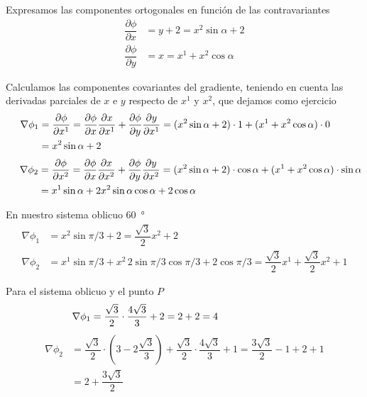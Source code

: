 Expresamos las componentes ortogonales en función de las contravariantes
\begin{align*}
  \dfrac{\partial\phi}{\partial x}
  &=
    y + 2
    = x^2\sin\alpha + 2\\
  \dfrac{\partial\phi}{\partial y}
  &=
    x
    = x^1 + x^2\cos\alpha
\end{align*}

Calculamos las componentes covariantes del gradiente, teniendo en cuenta las derivadas
parciales de $x$ e $y$ respecto de $x^1$ y $x^2$, que dejamos como ejercicio
\begin{align*}
  \hspace{-14em}
  \nabla\phi_1
  &=
    \dfrac{\partial\phi}{\partial x^1}
    = \dfrac{\partial\phi}{\partial x}\dfrac{\partial x}{\partial x^1}
    + \dfrac{\partial\phi}{\partial y}\dfrac{\partial y}{\partial x^1}
    = (x^2\sin\alpha+2)\cdot 1 + (x^1 + x^2\cos\alpha)\cdot 0\\
  &=
    x^2\sin\alpha + 2
\end{align*}
\begin{align*}
  \hspace{1.3em}
  \nabla\phi_2
  &=
    \dfrac{\partial\phi}{\partial x^2}
    = \dfrac{\partial\phi}{\partial x}\dfrac{\partial x}{\partial x^2}
    + \dfrac{\partial\phi}{\partial y}\dfrac{\partial y}{\partial x^2}
    = (x^2\sin\alpha+2)\cdot\cos\alpha + (x^1 + x^2\cos\alpha)\cdot\sin\alpha\\
  &=
    x^1\sin\alpha + 2x^2\sin\alpha\cos\alpha + 2\cos\alpha
\end{align*}

En nuestro sistema oblicuo \qty{60}{\degree}
\begin{align*}
  \nabla\phi_1
  &=
    x^2\sin\pi/3 + 2
    = \dfrac{\sqrt{3}}{2} x^2 + 2\\
  \nabla\phi_2
  &=
    x^1\sin\pi/3 + x^2\,2\sin\pi/3\cos\pi/3 + 2\cos\pi/3
    = \dfrac{\sqrt{3}}{2}x^1 + \dfrac{\sqrt{3}}{2} x^2 + 1
\end{align*}

Para el sistema oblicuo y el punto $P$
\begin{align*}
  \hspace{-7em}
  \nabla\phi_1
  &=
    \dfrac{\sqrt{3}}{2}\cdot \dfrac{4\sqrt{3}}{3} + 2
    = 2 + 2
    = 4
\end{align*}
\begin{align*}
  \nabla\phi_2
  &=
    \dfrac{\sqrt{3}}{2}\cdot \left(3-2\dfrac{\sqrt{3}}{3}\right)
    + \dfrac{\sqrt{3}}{2}\cdot\dfrac{4\sqrt{3}}{3} + 1
    = \dfrac{3\sqrt{3}}{2} - 1 + 2 + 1\\
  &=
    2+\dfrac{3\sqrt{3}}{2}
\end{align*}


